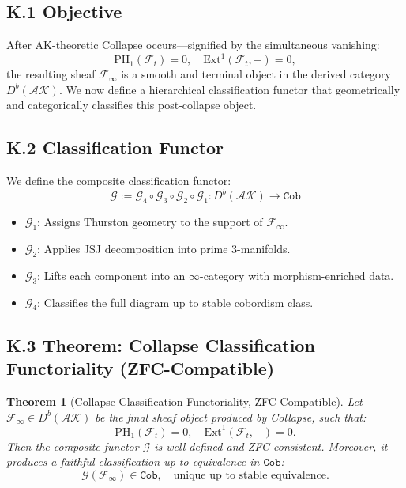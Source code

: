 \documentclass[11pt]{article}
\newtheorem{theorem}{Theorem}[section]
\begin{document}
\begin{axiom}
\begin{axiom}
\subsection*{K.1 Objective}

After AK-theoretic Collapse occurs—signified by the simultaneous vanishing:
\[
\mathrm{PH}_1(\mathcal{F}_t) = 0, \quad \mathrm{Ext}^1(\mathcal{F}_t, -) = 0,
\]
the resulting sheaf \( \mathcal{F}_\infty \) is a smooth and terminal object in the derived category \( D^b(\mathcal{AK}) \).  
We now define a hierarchical classification functor that geometrically and categorically classifies this post-collapse object.

\subsection*{K.2 Classification Functor}

We define the composite classification functor:
\[
\mathcal{G} := \mathcal{G}_4 \circ \mathcal{G}_3 \circ \mathcal{G}_2 \circ \mathcal{G}_1 : D^b(\mathcal{AK}) \longrightarrow \texttt{Cob}
\]
\begin{itemize}
  \item \( \mathcal{G}_1 \): Assigns Thurston geometry to the support of \( \mathcal{F}_\infty \).
  \item \( \mathcal{G}_2 \): Applies JSJ decomposition into prime 3-manifolds.
  \item \( \mathcal{G}_3 \): Lifts each component into an \( \infty \)-category with morphism-enriched data.
  \item \( \mathcal{G}_4 \): Classifies the full diagram up to stable cobordism class.
\end{itemize}

\subsection*{K.3 Theorem: Collapse Classification Functoriality (ZFC-Compatible)}

\begin{theorem}[Collapse Classification Functoriality, ZFC-Compatible]
Let \( \mathcal{F}_\infty \in D^b(\mathcal{AK}) \) be the final sheaf object produced by Collapse, such that:
\[
\mathrm{PH}_1(\mathcal{F}_t) = 0, \quad \mathrm{Ext}^1(\mathcal{F}_t, -) = 0.
\]
Then the composite functor \( \mathcal{G} \) is well-defined and ZFC-consistent.  
Moreover, it produces a faithful classification up to equivalence in \( \texttt{Cob} \):
\[
\mathcal{G}(\mathcal{F}_\infty) \in \texttt{Cob}, \quad \text{unique up to stable equivalence}.
\]
\end{theorem}


\end{axiom}
\end{axiom}
\end{document}
